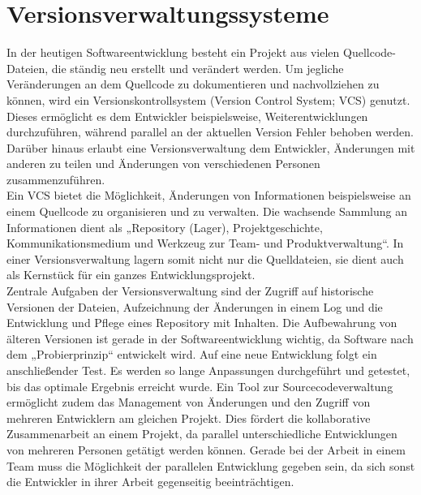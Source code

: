 \section{Versionsverwaltungssysteme}
In der heutigen Softwareentwicklung besteht ein Projekt aus vielen Quellcode-Dateien, die ständig neu erstellt und verändert werden. Um jegliche Veränderungen an dem Quellcode zu dokumentieren und nachvollziehen zu können, wird ein Versionskontrollsystem (Version Control System; VCS) genutzt.\autocite[Vgl.][S.6]{Baerisch.2005}  
Dieses ermöglicht es dem Entwickler beispielsweise, Weiterentwicklungen durchzuführen, während parallel an der aktuellen Version Fehler behoben werden. Darüber hinaus erlaubt eine Versionsverwaltung dem Entwickler, Änderungen mit anderen zu teilen und Änderungen von verschiedenen Personen zusammenzuführen.\autocite[Vgl.][S.9]{Kleine.2012} \\
Ein VCS bietet die Möglichkeit, Änderungen von Informationen beispielsweise an einem Quellcode zu organisieren und zu verwalten. \autocite[Vgl.][S.1]{Pilato.2009}
Die wachsende Sammlung an Informationen dient als „Repository (Lager), Projektgeschichte, Kommunikationsmedium und Werkzeug zur Team- und Produktverwaltung“.\autocite[][S.1]{Loeliger.2010} In einer Versionsverwaltung lagern somit nicht nur die Quelldateien, sie dient auch als Kernstück für ein ganzes Entwicklungsprojekt. \\
Zentrale Aufgaben der Versionsverwaltung sind der Zugriff auf historische Versionen der Dateien, Aufzeichnung der Änderungen in einem Log und die Entwicklung und Pflege eines Repository mit Inhalten. Die Aufbewahrung von älteren Versionen ist gerade in der Softwareentwicklung wichtig, da Software nach dem „Probierprinzip“\autocite[][S.9]{Versteegen.2003} entwickelt wird. Auf eine neue Entwicklung folgt ein anschließender Test. Es werden so lange Anpassungen durchgeführt und getestet, bis das optimale Ergebnis erreicht wurde.\autocite[Vgl.][S.9]{Versteegen.2003}
Ein Tool zur Sourcecodeverwaltung ermöglicht zudem das Management von Änderungen und den Zugriff von mehreren Entwicklern am gleichen Projekt.\autocite[Vgl.][S.1]{Loeliger.2010} Dies fördert die kollaborative Zusammenarbeit an einem Projekt, da parallel unterschiedliche Entwicklungen von mehreren Personen getätigt werden können. Gerade bei der Arbeit in einem Team muss die Möglichkeit der parallelen Entwicklung gegeben sein, da sich sonst die Entwickler in ihrer Arbeit gegenseitig beeinträchtigen.
